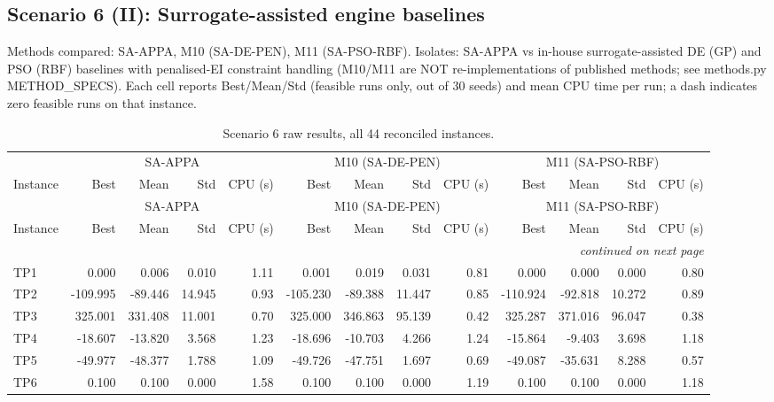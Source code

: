 \subsection{Scenario 6 (II): Surrogate-assisted engine baselines}
\label{app:scenario6}
Methods compared: SA-APPA, M10 (SA-DE-PEN), M11 (SA-PSO-RBF). Isolates: SA-APPA vs in-house surrogate-assisted DE (GP) and PSO (RBF) baselines with penalised-EI constraint handling (M10/M11 are NOT re-implementations of published methods; see methods.py METHOD\_SPECS). Each cell reports Best/Mean/Std (feasible runs only, out of 30 seeds) and mean CPU time per run; a dash indicates zero feasible runs on that instance.

\begingroup\scriptsize
\begin{longtable}{lrrrrrrrrrrrr}
\caption{Scenario 6 raw results, all 44 reconciled instances.}\label{tab:scenario6}\\
\toprule
 & \multicolumn{4}{c}{SA-APPA} & \multicolumn{4}{c}{M10 (SA-DE-PEN)} & \multicolumn{4}{c}{M11 (SA-PSO-RBF)} \\
\cmidrule(lr){2-5} \cmidrule(lr){6-9} \cmidrule(lr){10-13}
Instance & Best & Mean & Std & CPU (s) & Best & Mean & Std & CPU (s) & Best & Mean & Std & CPU (s) \\
\midrule
\endfirsthead
\toprule
 & \multicolumn{4}{c}{SA-APPA} & \multicolumn{4}{c}{M10 (SA-DE-PEN)} & \multicolumn{4}{c}{M11 (SA-PSO-RBF)} \\
\cmidrule(lr){2-5} \cmidrule(lr){6-9} \cmidrule(lr){10-13}
Instance & Best & Mean & Std & CPU (s) & Best & Mean & Std & CPU (s) & Best & Mean & Std & CPU (s) \\
\midrule
\endhead
\midrule\multicolumn{13}{r}{\emph{continued on next page}}\\\midrule
\endfoot
\bottomrule
\endlastfoot
TP1 & 0.000 & 0.006 & 0.010 & 1.11 & 0.001 & 0.019 & 0.031 & 0.81 & 0.000 & 0.000 & 0.000 & 0.80 \\
TP2 & -109.995 & -89.446 & 14.945 & 0.93 & -105.230 & -89.388 & 11.447 & 0.85 & -110.924 & -92.818 & 10.272 & 0.89 \\
TP3 & 325.001 & 331.408 & 11.001 & 0.70 & 325.000 & 346.863 & 95.139 & 0.42 & 325.287 & 371.016 & 96.047 & 0.38 \\
TP4 & -18.607 & -13.820 & 3.568 & 1.23 & -18.696 & -10.703 & 4.266 & 1.24 & -15.864 & -9.403 & 3.698 & 1.18 \\
TP5 & -49.977 & -48.377 & 1.788 & 1.09 & -49.726 & -47.751 & 1.697 & 0.69 & -49.087 & -35.631 & 8.288 & 0.57 \\
TP6 & 0.100 & 0.100 & 0.000 & 1.58 & 0.100 & 0.100 & 0.000 & 1.19 & 0.100 & 0.100 & 0.000 & 1.18 \\

\end{longtable}
